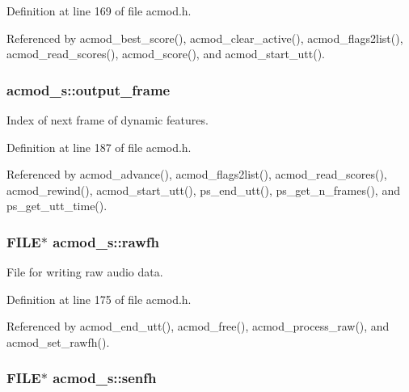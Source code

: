 \-Definition at line 169 of file acmod.\-h.



\-Referenced by acmod\-\_\-best\-\_\-score(), acmod\-\_\-clear\-\_\-active(), acmod\-\_\-flags2list(), acmod\-\_\-read\-\_\-scores(), acmod\-\_\-score(), and acmod\-\_\-start\-\_\-utt().

\subsubsection[{output\-\_\-frame}]{ {\bf acmod\-\_\-s\-::output\-\_\-frame}}\label{structacmod__s_aec694af0767ac5e8f1022b6252111885}


\-Index of next frame of dynamic features. 



\-Definition at line 187 of file acmod.\-h.



\-Referenced by acmod\-\_\-advance(), acmod\-\_\-flags2list(), acmod\-\_\-read\-\_\-scores(), acmod\-\_\-rewind(), acmod\-\_\-start\-\_\-utt(), ps\-\_\-end\-\_\-utt(), ps\-\_\-get\-\_\-n\-\_\-frames(), and ps\-\_\-get\-\_\-utt\-\_\-time().

\subsubsection[{rawfh}]{\setlength{\rightskip}{0pt plus 5cm}\-F\-I\-L\-E$\ast$ {\bf acmod\-\_\-s\-::rawfh}}\label{structacmod__s_aeac89442a04744ca607c4c66dab053e8}


\-File for writing raw audio data. 



\-Definition at line 175 of file acmod.\-h.



\-Referenced by acmod\-\_\-end\-\_\-utt(), acmod\-\_\-free(), acmod\-\_\-process\-\_\-raw(), and acmod\-\_\-set\-\_\-rawfh().

\subsubsection[{senfh}]{\setlength{\rightskip}{0pt plus 5cm}\-F\-I\-L\-E$\ast$ {\bf acmod\-\_\-s\-::senfh}}\label{structacmod__s_aba97a9733b64074f3a4699dfbaed5ffd}


